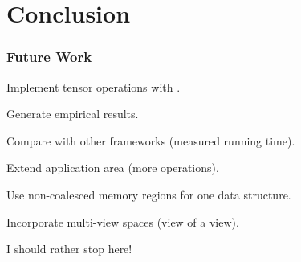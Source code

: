 \section{Conclusion}

\begin{frame}
\frametitle{Future Work}
\bi
\item Implement tensor operations with .
\item Generate empirical results.
\item Compare with other frameworks (measured running time).
\item Extend application area (more operations).
\item Use non-coalesced memory regions for one data structure.
\item Incorporate multi-view spaces (view of a view).
\ei

\centering
\vskip3cm

I should rather stop here!


\end{frame}
